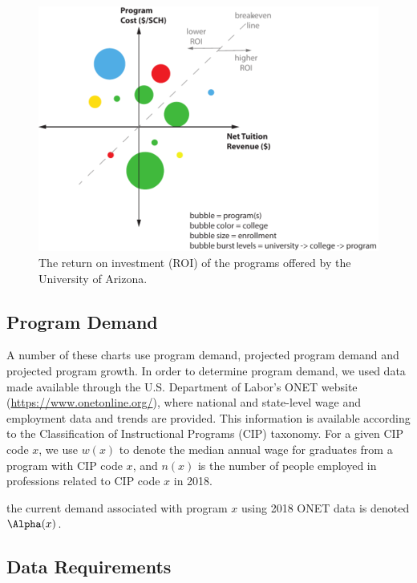 \documentclass[12pt]{article}
\theoremstyle{definition}%
\begin{document}
\begin{figure}
 \centerline{\includegraphics[width=4.75in]{./graphics/quad-bubble-ROI.pdf}}
  \caption{The return on investment (ROI) of the programs offered by the University of Arizona.}
\end{figure}


\subsection{Program Demand}
A number of these charts use program demand, projected program demand and projected program growth.  
In order to determine program demand, we used data made available through the U.S. Department of Labor's ONET website (\url{https://www.onetonline.org/}), where 
national and state-level wage and employment data and trends are provided.  This information is available according to the Classification of Instructional Programs (CIP) taxonomy.  For a given CIP code $x$,  we use $w(x)$ to denote the median annual wage for graduates from a program with CIP code $x$, and $n(x)$ is the number of people employed in professions related to CIP code $x$ in 2018.

the current demand associated with program $x$ using 2018 ONET data is denoted $\Alpha(x)$.

\subsection{Data Requirements}
 
\end{document}
